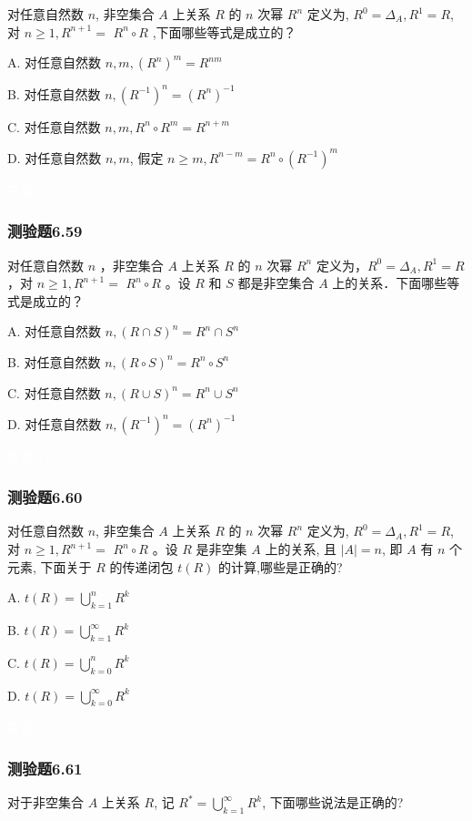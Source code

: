 \documentclass[UTF8, heading=true]{ctexart}
\begin{document}
对任意自然数 $n$, 非空集合 $A$ 上关系 $R$ 的 $n$ 次幂 $R^n$ 定义为, $R^0=\Delta_A, R^1=R$, 对 $n \geq 1, R^{n+1}=$
$R^n \circ R$ ,下面哪些等式是成立的？

A. 对任意自然数 $n, m,\left(R^n\right)^m=R^{n m}$

B. 对任意自然数 $n,\left(R^{-1}\right)^n=\left(R^n\right)^{-1}$

C. 对任意自然数 $n, m, R^n \circ R^m=R^{n+m}$

D. 对任意自然数 $n, m$, 假定 $n \geq m, R^{n-m}=R^n \circ\left(R^{-1}\right)^m$

\textcolor{white}{答案：ABC}

\subsubsection{测验题6.59}

对任意自然数 $n$ ，非空集合 $A$ 上关系 $R$ 的 $n$ 次幂 $R^n$ 定义为，$R^0=\Delta_A, R^1=R$ ，对 $n \geq 1, R^{n+1}=$
$R^n \circ R$ 。设 $R$ 和 $S$ 都是非空集合 $A$ 上的关系．下面哪些等式是成立的？

A. 对任意自然数 $n,(R \cap S)^n=R^n \cap S^n$

B. 对任意自然数 $n,(R \circ S)^n=R^n \circ S^n$


C. 对任意自然数 $n,(R \cup S)^n=R^n \cup S^n$

D.  对任意自然数 $n,\left(R^{-1}\right)^n=\left(R^n\right)^{-1}$

\textcolor{white}{答案：D}

\subsubsection{测验题6.60}

对任意自然数 $n$, 非空集合 $A$ 上关系 $R$ 的 $n$ 次幂 $R^n$ 定义为, $R^0=\Delta_A, R^1=R$, 对 $n \geq 1, R^{n+1}=$ $R^n \circ R$ 。设 $R$ 是非空集 $A$ 上的关系, 且 $|A|=n$, 即 $A$ 有 $n$ 个元素, 下面关于 $R$ 的传递闭包 $t(R)$ 的计算,哪些是正确的?

A. $t(R)=\bigcup_{k=1}^n R^k$

B. $t(R)=\bigcup_{k=1}^{\infty} R^k$

C. $t(R)=\bigcup_{k=0}^n R^k$

D. $t(R)=\bigcup_{k=0}^{\infty} R^k$

\textcolor{white}{答案：AB}

\subsubsection{测验题6.61}
对于非空集合 $A$ 上关系 $R$, 记 $R^*=\bigcup_{k=1}^{\infty} R^k$, 下面哪些说法是正确的?
\end{document}
